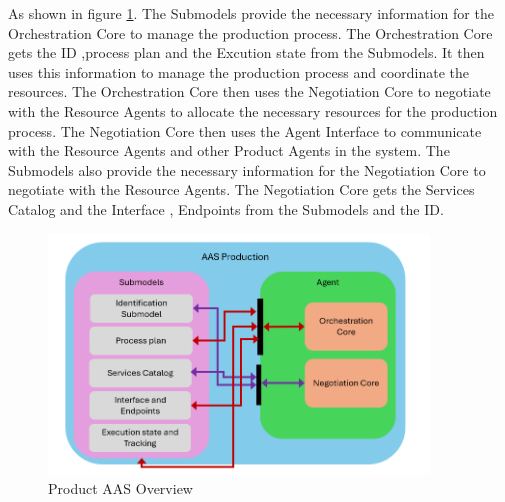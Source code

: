 As shown in figure \ref{fig:product_aas_overview}. The Submodels provide the necessary information for the Orchestration Core to manage the production process.
The Orchestration Core gets the ID ,process plan and the Excution state from the Submodels.
It then uses this information to manage the production process and coordinate the resources.
The Orchestration Core then uses the Negotiation Core to negotiate with the Resource Agents to allocate the necessary resources for the production process.
The Negotiation Core then uses the Agent Interface to communicate with the Resource Agents and other Product Agents in the system.
The Submodels also provide the necessary information for the Negotiation Core to negotiate with the Resource Agents.
The Negotiation Core gets the Services Catalog and the Interface , Endpoints from the Submodels and the ID.
\begin{figure}[h]
    \centering
    \includegraphics[width=0.9\textwidth]{Images/Production_Agent_overview.png}
    \caption{Product AAS Overview}
    \label{fig:product_aas_overview}
\end{figure}

